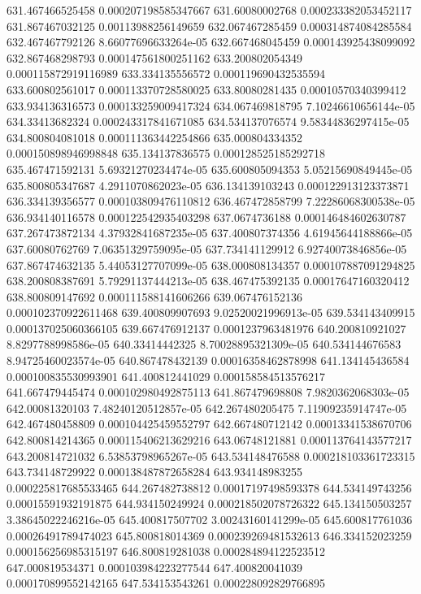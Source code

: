 {631.467466525458 0.000207198585347667
631.60080002768 0.000233382053452117
631.867467032125 0.00113988256149659
632.067467285459 0.000314874084285584
632.467467792126 8.66077696633264e-05
632.667468045459 0.000143925438099092
632.867468298793 0.000147561800251162
633.200802054349 0.000115872919116989
633.334135556572 0.000119690432535594
633.600802561017 0.000113370728580025
633.80080281435 0.00010570340399412
633.934136316573 0.000133259009417324
634.067469818795 7.10246610656144e-05
634.33413682324 0.000243317841671085
634.534137076574 9.58344836297415e-05
634.800804081018 0.000111363442254866
635.000804334352 0.000150898946998848
635.134137836575 0.000128525185292718
635.467471592131 5.69321270234474e-05
635.600805094353 5.05215690849445e-05
635.800805347687 4.2911070862023e-05
636.134139103243 0.000122913123373871
636.334139356577 0.000103809476110812
636.467472858799 7.22286068300538e-05
636.934140116578 0.000122542935403298
637.0674736188 0.000146484602630787
637.267473872134 4.37932841687235e-05
637.400807374356 4.61945644188866e-05
637.60080762769 7.06351329759095e-05
637.734141129912 6.92740073846856e-05
637.867474632135 5.44053127707099e-05
638.000808134357 0.000107887091294825
638.200808387691 5.79291137444213e-05
638.467475392135 0.00017647160320412
638.800809147692 0.000111588141606266
639.067476152136 0.000102370922611468
639.400809907693 9.02520021996913e-05
639.534143409915 0.000137025060366105
639.667476912137 0.0001237963481976
640.200810921027 8.8297788998586e-05
640.33414442325 8.70028895321309e-05
640.534144676583 8.94725460023574e-05
640.867478432139 0.00016358462878998
641.134145436584 0.000100835530993901
641.400812441029 0.000158584513576217
641.667479445474 0.000102980492875113
641.867479698808 7.9820362068303e-05
642.00081320103 7.48240120512857e-05
642.267480205475 7.11909235914747e-05
642.467480458809 0.000104425459552797
642.667480712142 0.00013341538670706
642.800814214365 0.000115406213629216
643.06748121881 0.000113764143577217
643.200814721032 6.53853798965267e-05
643.534148476588 0.000218103361723315
643.734148729922 0.000138487872658284
643.934148983255 0.000225817685533465
644.267482738812 0.00017197498593378
644.534149743256 0.00015591932191875
644.934150249924 0.000218502078726322
645.134150503257 3.38645022246216e-05
645.400817507702 3.00243160141299e-05
645.600817761036 0.00026491789474023
645.800818014369 0.000239269481532613
646.334152023259 0.000156256985315197
646.800819281038 0.000284894122523512
647.000819534371 0.000103984223277544
647.400820041039 0.000170899552142165
647.534153543261 0.000228092829766895
}
